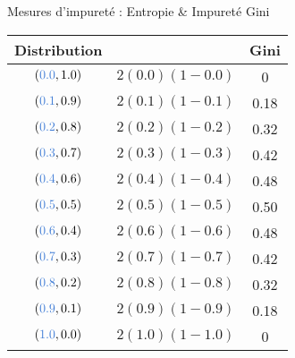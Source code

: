 \begin{frame}{\vskip -0.2cm \Large Mesures d'impuret\'e : Entropie \& Impuret\'e Gini}
\begin{multicols}{2}
	\pause
	\begin{minipage}{4.5cm}
	\begin{flushright}
	{\normalsize
	\begin{tabular}{|c|c|c|}
	\hline
	{\small Distribution} && {\small Gini} \\
	\hline \hline
	$({\color{gcblue}0.0}, 1.0)$ & \textnormal{\tiny$2(0.0)(1-0.0)$} & 0 \\
	$({\color{gcblue}0.1}, 0.9)$ & \textnormal{\tiny$2(0.1)(1-0.1)$} & 0.18 \\
	$({\color{gcblue}0.2}, 0.8)$ & \textnormal{\tiny$2(0.2)(1-0.2)$} & 0.32 \\
	$({\color{gcblue}0.3}, 0.7)$ & \textnormal{\tiny$2(0.3)(1-0.3)$} & 0.42 \\
	$({\color{gcblue}0.4}, 0.6)$ & \textnormal{\tiny$2(0.4)(1-0.4)$} & 0.48 \\
	$({\color{gcblue}0.5}, 0.5)$ & \textnormal{\tiny$2(0.5)(1-0.5)$} & 0.50 \\
	$({\color{gcblue}0.6}, 0.4)$ & \textnormal{\tiny$2(0.6)(1-0.6)$} & 0.48 \\
	$({\color{gcblue}0.7}, 0.3)$ & \textnormal{\tiny$2(0.7)(1-0.7)$} & 0.42 \\
	$({\color{gcblue}0.8}, 0.2)$ & \textnormal{\tiny$2(0.8)(1-0.8)$} & 0.32 \\
	$({\color{gcblue}0.9}, 0.1)$ & \textnormal{\tiny$2(0.9)(1-0.9)$} & 0.18 \\
	$({\color{gcblue}1.0}, 0.0)$ & \textnormal{\tiny$2(1.0)(1-1.0)$} & 0      \\
	\hline
	\end{tabular}
	}
	\end{flushright}
	\end{minipage}
	
\end{multicols}

\end{frame}
\normalsize


